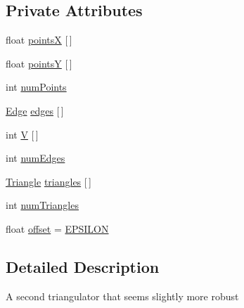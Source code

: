 \subsection*{Private Attributes}
\begin{DoxyCompactItemize}
\item 
float \mbox{\hyperlink{classorg_1_1newdawn_1_1slick_1_1geom_1_1_neat_triangulator_a651e2f489c027306dacf8b03fb0f04a0}{pointsX}} \mbox{[}$\,$\mbox{]}
\item 
float \mbox{\hyperlink{classorg_1_1newdawn_1_1slick_1_1geom_1_1_neat_triangulator_ac4491217b5be9c7a1ccbdb5511f832d9}{pointsY}} \mbox{[}$\,$\mbox{]}
\item 
int \mbox{\hyperlink{classorg_1_1newdawn_1_1slick_1_1geom_1_1_neat_triangulator_a24b4a230bc11d3c96dfe1de4dcb297f5}{num\+Points}}
\item 
\mbox{\hyperlink{classorg_1_1newdawn_1_1slick_1_1geom_1_1_neat_triangulator_1_1_edge}{Edge}} \mbox{\hyperlink{classorg_1_1newdawn_1_1slick_1_1geom_1_1_neat_triangulator_a0abf260e1febb5ef0afc9894280f9efb}{edges}} \mbox{[}$\,$\mbox{]}
\item 
int \mbox{\hyperlink{classorg_1_1newdawn_1_1slick_1_1geom_1_1_neat_triangulator_a149e043fb9cba67d89b3bcc8fb188df6}{V}} \mbox{[}$\,$\mbox{]}
\item 
int \mbox{\hyperlink{classorg_1_1newdawn_1_1slick_1_1geom_1_1_neat_triangulator_a4c9fba4faad072774b3b0fcbc7fd0fff}{num\+Edges}}
\item 
\mbox{\hyperlink{classorg_1_1newdawn_1_1slick_1_1geom_1_1_neat_triangulator_1_1_triangle}{Triangle}} \mbox{\hyperlink{classorg_1_1newdawn_1_1slick_1_1geom_1_1_neat_triangulator_a007f9ede3582ce3c9c1439b40e4e5f55}{triangles}} \mbox{[}$\,$\mbox{]}
\item 
int \mbox{\hyperlink{classorg_1_1newdawn_1_1slick_1_1geom_1_1_neat_triangulator_a5a9d015e9872ed5961cddfb49b3d1853}{num\+Triangles}}
\item 
float \mbox{\hyperlink{classorg_1_1newdawn_1_1slick_1_1geom_1_1_neat_triangulator_ab147880b88dbf400f31c1a5ac9667c7e}{offset}} = \mbox{\hyperlink{classorg_1_1newdawn_1_1slick_1_1geom_1_1_neat_triangulator_a3591ad18c067004e78b06217362e3d7b}{E\+P\+S\+I\+L\+ON}}
\end{DoxyCompactItemize}


\subsection{Detailed Description}
A second triangulator that seems slightly more robust

